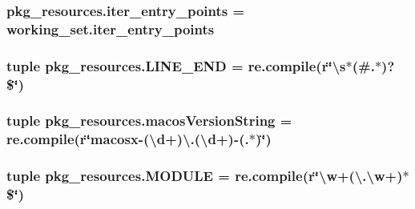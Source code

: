 \subsubsection[{iter\+\_\+entry\+\_\+points}]{\setlength{\rightskip}{0pt plus 5cm}pkg\+\_\+resources.\+iter\+\_\+entry\+\_\+points = working\+\_\+set.\+iter\+\_\+entry\+\_\+points}\label{namespacepkg__resources_a0003897e2044a6bedb14a89ad7cc5ce9}
\hypertarget{namespacepkg__resources_a2d5191a95b610ccb4136b29578ce05d4}{}
\subsubsection[{L\+I\+N\+E\+\_\+\+E\+N\+D}]{\setlength{\rightskip}{0pt plus 5cm}tuple pkg\+\_\+resources.\+L\+I\+N\+E\+\_\+\+E\+N\+D = re.\+compile({\bf r}\char`\"{}\textbackslash{}s$\ast$(\#.$\ast$)?\$\char`\"{})}\label{namespacepkg__resources_a2d5191a95b610ccb4136b29578ce05d4}
\hypertarget{namespacepkg__resources_a7449327da8c51c25a18a5bc9c46b0820}{}
\subsubsection[{macos\+Version\+String}]{\setlength{\rightskip}{0pt plus 5cm}tuple pkg\+\_\+resources.\+macos\+Version\+String = re.\+compile({\bf r}\char`\"{}macosx-\/(\textbackslash{}d+)\textbackslash{}.(\textbackslash{}d+)-\/(.$\ast$)\char`\"{})}\label{namespacepkg__resources_a7449327da8c51c25a18a5bc9c46b0820}
\hypertarget{namespacepkg__resources_aee0791fb8fdb71ab7dc8e286061fbf45}{}
\subsubsection[{M\+O\+D\+U\+L\+E}]{\setlength{\rightskip}{0pt plus 5cm}tuple pkg\+\_\+resources.\+M\+O\+D\+U\+L\+E = re.\+compile({\bf r}\char`\"{}\textbackslash{}w+(\textbackslash{}.\textbackslash{}w+)$\ast$\$\char`\"{})}\label{namespacepkg__resources_aee0791fb8fdb71ab7dc8e286061fbf45}
\hypertarget{namespacepkg__resources_a47cc940535c52e3219e4f740dde2e617}{}
